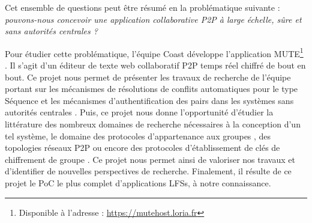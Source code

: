 Cet ensemble de questions peut être résumé en la problématique suivante : \emph{pouvons-nous concevoir une application collaborative \ac{P2P} à large échelle, sûre et sans autorités centrales ?}

Pour étudier cette problématique, l'équipe Coast développe l'application \acf{MUTE}\footnote{Disponible à l'adresse : \url{https://mutehost.loria.fr}} \cite{MUTE2017}.
Il s'agit d'un éditeur de texte web collaboratif \ac{P2P} temps réel chiffré de bout en bout.
Ce projet nous permet de présenter les travaux de recherche de l'équipe portant sur les mécanismes de résolutions de conflits automatiques pour le type Séquence \cite{2013-logootsplit,2021-these-vic,2022-rls-tpds-nicolas} et les mécanismes d'authentification des pairs dans les systèmes sans autorités centrales \cite{2018-trusternity-short,2018-trusternity-long}.
Puis, ce projet nous donne l'opportunité d'étudier la littérature des nombreux domaines de recherche nécessaires à la conception d'un tel système, \ie le domaine des protocoles d'appartenance aux groupes \cite{swim2002, lifeguard2018}, des topologies réseaux \ac{P2P} \cite{2018-spray-nedelec} ou encore des protocoles d'établissement de clés de chiffrement de groupe \cite{1995-burmester-desmedt}.
Ce projet nous permet ainsi de valoriser nos travaux et d'identifier de nouvelles perspectives de recherche.
Finalement, il résulte de ce projet le \acf{PoC} le plus complet d'applications \acp{LFS}, à notre connaissance.
